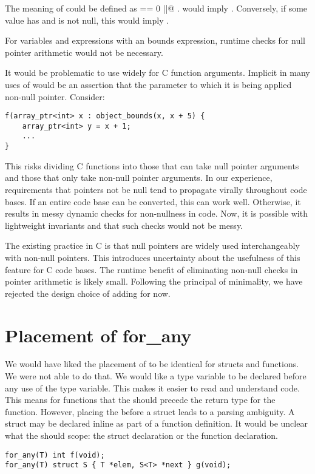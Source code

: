 The meaning of 
could be defined as  \lstinline@== 0 ||@ .
 would imply .
Conversely, if some value  has  and
 is not null, this would imply .

For variables and expressions with an 
bounds expression, runtime checks for null pointer arithmetic
would not be necessary.

It would be problematic to use  widely for
C function arguments.   Implicit in many uses of
 would be an assertion that the parameter
to which it is being applied  non-null pointer.  Consider:
\begin{lstlisting}
f(array_ptr<int> x : object_bounds(x, x + 5) {
    array_ptr<int> y = x + 1;
    ...
}
\end{lstlisting}
This risks dividing C functions into those that can
take null pointer arguments and those that only take non-null 
pointer arguments. In our experience, requirements that pointers 
not be null tend to propagate virally throughout code bases.  If an 
entire code base can be  converted, this can work well.  Otherwise, 
it results in messy dynamic checks for non-nullness in code.
Now, it is possible with lightweight invariants and 
that such checks would not be messy.

The existing practice in C is that null pointers are widely used interchangeably
with non-null pointers.  This introduces uncertainty about the usefulness of this 
feature for C code bases.  The runtime benefit of eliminating non-null
checks in pointer arithmetic is likely small.  Following the principal of 
minimality, we have rejected the design choice of adding  
for now. 

\section{Placement of for\_any}
\label{section:foranyalternatives}
We would have liked the placement of \forany{} to be identical for structs
and functions.  We were not able to do that. We would like a type variable to be declared 
before any use of the type variable.  This makes it easier to read and understand
code.  This means for functions that the \forany{} should precede the
return type for the function.  However, placing the \forany{} before 
a struct leads to a parsing ambiguity.  A struct may be declared inline as
part of a function definition.  It would be unclear what the \forany{} should
scope: the struct declaration or the function declaration.
\begin{verbatim}
for_any(T) int f(void);
for_any(T) struct S { T *elem, S<T> *next } g(void);
\end{verbatim}

